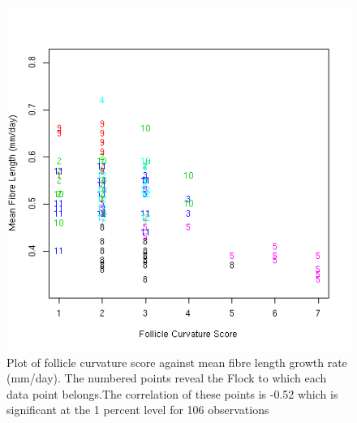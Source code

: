 %

\begin{figure}[!h]
  \centering
  \includegraphics[width=1.0\textwidth]{fcfl.png}
  \caption{Plot of follicle curvature score against mean fibre length growth rate (mm/day). The numbered points reveal the Flock to which each data point belongs.The correlation of these points is -0.52 which is significant at the 1 percent level for 106 observations}
  \label{fig:fcfl}
\end{figure}

%

